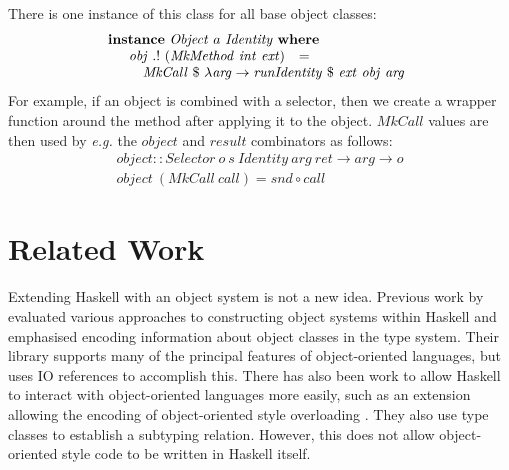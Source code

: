 There is one instance of this class for all base object classes:
\begin{displaymath}
\begin{array}{l}
\mathbf{instance}~\mathit{Object}~a~\mathit{Identity}~\mathbf{where}\\
\quad \begin{array}{lcl}
\mathit{obj}~.!~(\mathit{MkMethod}~\mathit{int}~\mathit{ext}) & = & \\
\multicolumn{3}{l}{\quad \mathit{MkCall}~ \$~\lambda \mathit{arg} \to \mathit{runIdentity}~\$~\mathit{ext}~\mathit{obj}~\mathit{arg} } %
\end{array}
\end{array}
\end{displaymath}
For example, if an object is combined with a selector, then we create a wrapper function around the method after applying it to the object. $\mathit{MkCall}$ values are then used by \emph{e.g.} the $\mathit{object}$ and $\mathit{result}$ combinators as follows:
\begin{displaymath}
\begin{array}{l}
\mathit{object} :: \mathit{Selector}~o~s~\mathit{Identity}~\mathit{arg}~\mathit{ret} \to arg \to o\\
\mathit{object}~(\mathit{MkCall}~\mathit{call})  = \mathit{snd} \circ \mathit{call}
\end{array}
\end{displaymath}



\section{Related Work}
\label{sec:related}

Extending Haskell with an object system is not a new idea. Previous work by \citet{kiselyov2005haskell} evaluated various approaches to constructing object systems within Haskell and emphasised encoding information about object classes in the type system. Their library supports many of the principal features of object-oriented languages, but uses IO references to accomplish this. There has also been work to allow Haskell to interact with object-oriented languages more easily, such as an extension allowing the encoding of object-oriented style overloading \cite{shields2001object}. They also use type classes to establish a subtyping relation. However, this does not allow object-oriented style code to be written in Haskell itself.


